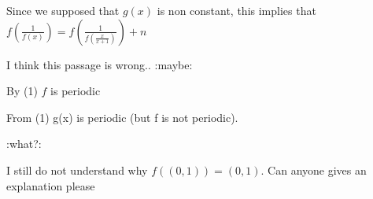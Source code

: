 \begin{mysolution}
	\begin{tcolorbox}
Since we supposed that $g(x)$ is non constant, this implies that $f(\frac{1}{f(x)})=f(\frac{1}{f(\frac{x}{x+1})})+n$
\end{tcolorbox}

I think this passage is wrong..  :maybe:
\end{mysolution}



\begin{mysolution}
	\begin{tcolorbox}By (1) $f$ is periodic\end{tcolorbox}
\begin{tcolorbox} From (1) g(x) is periodic (but f is not periodic).\end{tcolorbox}
 :what?: 
\end{mysolution}



\begin{mysolution}
	I still do not understand why $f((0,1))=(0,1)$.
Can anyone gives an explanation please
\end{mysolution}



